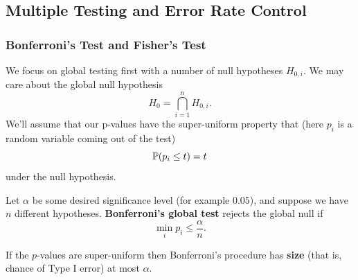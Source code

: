 \subsection{Multiple Testing and Error Rate Control}

\subsubsection{Bonferroni’s Test and Fisher's Test}
We focus on global testing first with a number of null hypotheses $H_{0,i}$. We may care about the global null hypothesis
\[
H_0 = \bigcap_{i=1}^n H_{0,i}.
\]
We’ll assume that our p-values have the super-uniform property that (here $p_i$ is a random variable coming out of the test)
\[
\mathbb{P} (p_i\le t) = t
\]
under the null hypothesis.

\begin{defn}
Let $\alpha$ be some desired significance level (for example $0.05$), and suppose we have $n$ different hypotheses. \textbf{Bonferroni's global test} rejects the global null if
\[
\min_i p_i \leq \frac{\alpha}{n}.
\]
\end{defn}

\begin{prop}
If the $p$-values are super-uniform then Bonferroni's procedure has \textbf{size} (that is, chance of Type I error) at most $\alpha$.
\end{prop}

